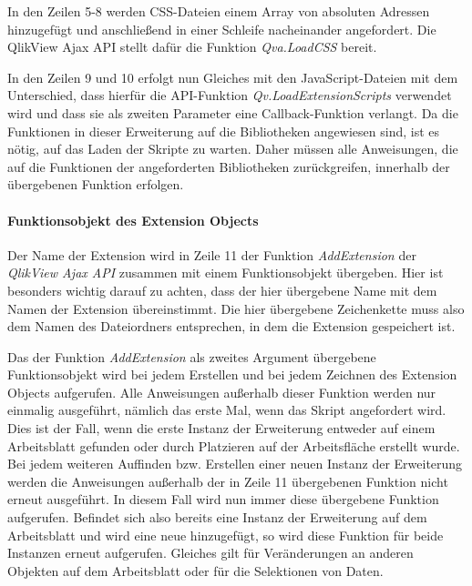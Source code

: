 In den Zeilen 5-8 werden CSS-Dateien einem Array von absoluten Adressen hinzugefügt und anschließend in einer Schleife nacheinander angefordert. Die QlikView Ajax API stellt dafür die Funktion \textit{Qva.LoadCSS} bereit.

In den Zeilen 9 und 10 erfolgt nun Gleiches mit den JavaScript-Dateien mit dem Unterschied, dass hierfür die API-Funktion \textit{Qv.LoadExtensionScripts} verwendet wird und dass sie als zweiten Parameter eine Callback-Funktion verlangt. Da die Funktionen in dieser Erweiterung auf die Bibliotheken angewiesen sind, ist es nötig, auf das Laden der Skripte zu warten. Daher müssen alle Anweisungen, die auf die Funktionen der angeforderten Bibliotheken zurückgreifen, innerhalb der übergebenen Funktion erfolgen.




\paragraph{Funktionsobjekt des Extension Objects}

Der Name der Extension wird in Zeile 11 der Funktion \textit{AddExtension} der \textit{QlikView Ajax API} zusammen mit einem Funktionsobjekt übergeben. Hier ist besonders wichtig darauf zu achten, dass der hier übergebene Name mit dem Namen der Extension übereinstimmt. Die hier übergebene Zeichenkette muss also dem Namen des Datei\-ordners entsprechen, in dem die Extension gespeichert ist.

Das der Funktion \textit{AddExtension} als zweites Argument übergebene Funktionsobjekt wird bei jedem Erstellen und bei jedem Zeichnen des Extension Objects aufgerufen. Alle Anweisungen außerhalb dieser Funktion werden nur einmalig ausgeführt, nämlich das erste Mal, wenn das Skript angefordert wird. Dies ist der Fall, wenn die erste Instanz der Erweiterung entweder auf einem Arbeitsblatt gefunden oder durch Platzieren auf der Arbeitsfläche erstellt wurde. Bei jedem weiteren Auffinden bzw. Erstellen einer neuen Instanz der Erweiterung werden die Anweisungen außerhalb der in Zeile 11 übergebenen Funktion nicht erneut ausgeführt. In diesem Fall wird nun immer diese übergebene Funktion aufgerufen. Befindet sich also bereits eine Instanz der Erweiterung auf dem Arbeitsblatt und wird eine neue hinzugefügt, so wird diese Funktion für beide Instanzen erneut aufgerufen. Gleiches gilt für Veränderungen an anderen Objekten auf dem Arbeitsblatt oder für die Selektionen von Daten.


